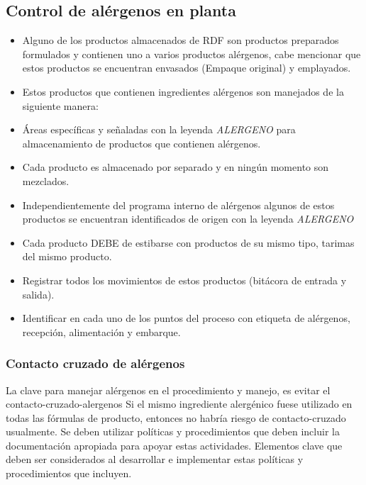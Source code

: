 \subsection{Control de alérgenos en planta}
\begin{itemize}
	\item Alguno de los productos almacenados de \gls{RDF} son productos preparados formulados y contienen uno a varios productos alérgenos, cabe mencionar que estos productos se encuentran envasados (Empaque original) y emplayados.
	\item Estos productos que contienen ingredientes alérgenos son manejados de la siguiente manera:
	\item Áreas específicas y señaladas con la leyenda \emph{ALERGENO} para almacenamiento de productos que contienen alérgenos.
	\item Cada producto es almacenado por separado y en ningún momento son mezclados.
	\item Independientemente del programa interno de alérgenos algunos de estos productos se encuentran identificados de origen con la leyenda \emph{ALERGENO}
	\item Cada producto DEBE de estibarse con productos de su mismo tipo, tarimas del mismo producto.
	\item Registrar todos los movimientos de estos productos (bitácora de entrada y salida).
	\item Identificar en cada uno de los puntos del proceso con etiqueta de alérgenos, recepción, alimentación y embarque.
\end{itemize}

\subsubsection{Contacto cruzado de alérgenos}
La clave para manejar alérgenos en el procedimiento y manejo, es evitar el \gls{contacto-cruzado-alergenos} Si el mismo ingrediente alergénico fuese utilizado en todas las fórmulas de producto, entonces no habría riesgo de contacto-cruzado usualmente. Se deben utilizar políticas y procedimientos que deben incluir la documentación apropiada para apoyar estas actividades. Elementos clave que deben ser considerados al desarrollar e implementar estas políticas y procedimientos que incluyen.

